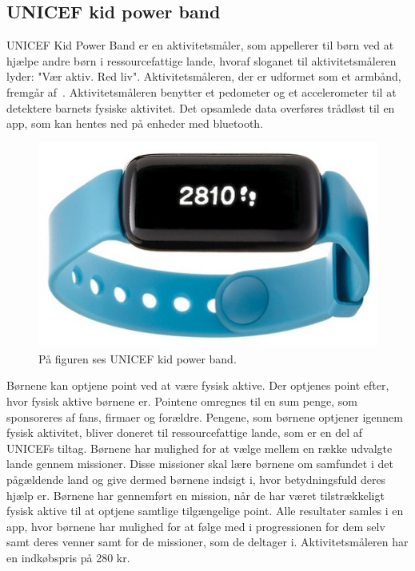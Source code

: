 \subsection{UNICEF kid power band}
UNICEF Kid Power Band er en aktivitetsmåler, som appellerer til børn ved at hjælpe andre børn i ressourcefattige lande, hvoraf sloganet til aktivitetsmåleren lyder: "Vær aktiv. Red liv".
Aktivitetsmåleren, der er udformet som et armbånd, fremgår af~. Aktivitetsmåleren benytter et pedometer og et accelerometer til at detektere barnets fysiske aktivitet. Det opsamlede data overføres trådløst til en app, som kan hentes ned på enheder med bluetooth. \citep{PowerAbout2015,PowerManual2015}

\begin{figure}[H]
	\centering
	\includegraphics[scale=0.55]{figures/aProblemanalyse/unicef.png}
	\caption{På figuren ses UNICEF kid power band. \cite{Unicef2016}}
	\label{fig:unicef}
\end{figure}
Børnene kan optjene point ved at være fysisk aktive. Der optjenes point efter, hvor fysisk aktive børnene er. Pointene omregnes til en sum penge, som sponsoreres af fans, firmaer og forældre. Pengene, som børnene optjener igennem fysisk aktivitet, bliver doneret til ressourcefattige lande, som er en del af UNICEFs tiltag. %
Børnene har mulighed for at vælge mellem en række udvalgte lande gennem missioner. Disse missioner skal lære børnene om samfundet i det pågældende land og give dermed børnene indsigt i, hvor betydningsfuld deres hjælp er. Børnene har gennemført en mission, når de har været tilstrækkeligt fysisk aktive til at optjene samtlige tilgængelige point. Alle resultater samles i en app, hvor børnene har mulighed for at følge med i progressionen for dem selv samt deres venner samt for de missioner, som de deltager i. Aktivitetsmåleren har en indkøbspris på 280 kr. \citep{PowerAbout2015,PowerManual2015}



